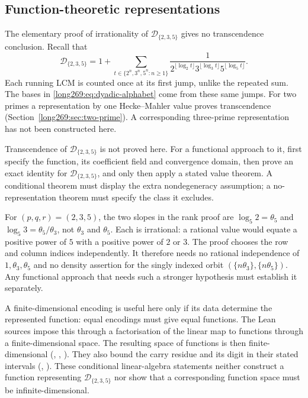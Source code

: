 \subsection{Function-theoretic representations}\label{long269:sec:function-representation}

The elementary proof of irrationality of $\mathcal D_{\{2,3,5\}}$ gives
no transcendence conclusion. Recall that
\[
 \mathcal D_{\{2,3,5\}}=1+
 \sum_{t\in\{2^n,3^n,5^n:n\ge1\}}
 \frac1{2^{\lfloor\log_2t\rfloor}3^{\lfloor\log_3t\rfloor}
             5^{\lfloor\log_5t\rfloor}}.
\]
Each running LCM is counted once at its first jump, unlike the repeated sum.
The bases in \eqref{long269:eq:dyadic-alphabet} come from these same jumps.
For two primes a representation by one Hecke--Mahler value proves
transcendence (Section~\ref{long269:sec:two-prime}). A corresponding
three-prime representation has not been constructed here.

\begin{problem}
\label{long269:prob:representation}
Transcendence of $\mathcal D_{\{2,3,5\}}$ is not proved here.  For a functional
approach to it, first specify the function, its coefficient field and
convergence domain, then prove an exact identity for $\mathcal D_{\{2,3,5\}}$,
and only then apply a stated value theorem.  A conditional theorem must
display the extra nondegeneracy assumption; a no-representation theorem
must specify the class it excludes.
\end{problem}

For $(p,q,r)=(2,3,5)$, the two slopes in the rank proof are
$\log_5 2=\theta_5$ and $\log_5 3=\theta_5/\theta_3$, not $\theta_3$ and
$\theta_5$.  Each is irrational: a rational value would equate a positive
power of $5$ with a positive power of $2$ or $3$.  The proof chooses the
row and column indices independently.  It therefore needs no rational
independence of $1,\theta_3,\theta_5$ and no density assertion for the
singly indexed orbit $(\{n\theta_3\},\{n\theta_5\})$.  Any functional
approach that needs such a stronger hypothesis must establish it separately.

A finite-dimensional encoding is useful here only if its data determine
the represented function: equal encodings must give equal functions.
The Lean sources impose this through a factorisation of the linear map
to functions through a finite-dimensional space. The resulting space of
functions is then finite-dimensional
(,
,
).  They also bound the carry residue and its digit in their
stated intervals
(,
).  These conditional linear-algebra statements neither construct a
function representing $\mathcal D_{\{2,3,5\}}$ nor show that a corresponding
function space must be infinite-dimensional.

